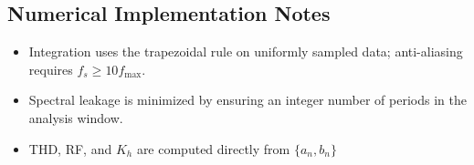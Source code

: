 \documentclass[nohyper,nobib,xcolor=dvipsnames,svgnames,x11names]{tufte-book}
\begin{document}
\subsection{Numerical Implementation Notes}
\begin{itemize}
\item Integration uses the trapezoidal rule on uniformly sampled data; anti-aliasing requires $f_{s}\ge 10f_{\max}$.
\item Spectral leakage is minimized by ensuring an integer number of periods in the analysis window.
\item THD, RF, and $K_{h}$ are computed directly from $\{a_{n},b_{n}\}$ 

\end{itemize}
\end{document}

